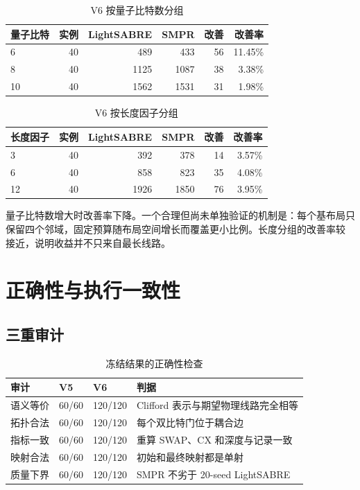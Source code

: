 \documentclass[11pt,a4paper]{article}
\begin{document}
\begin{table}[H]
\centering
\caption{V6 按量子比特数分组}
\begin{tabular}{lrrrrr}
\toprule
量子比特 & 实例 & LightSABRE & SMPR & 改善 & 改善率 \\
\midrule
6 & 40 & 489 & 433 & 56 & 11.45\% \\
8 & 40 & 1125 & 1087 & 38 & 3.38\% \\
10 & 40 & 1562 & 1531 & 31 & 1.98\% \\
\bottomrule
\end{tabular}
\end{table}

\begin{table}[H]
\centering
\caption{V6 按长度因子分组}
\begin{tabular}{lrrrrr}
\toprule
长度因子 & 实例 & LightSABRE & SMPR & 改善 & 改善率 \\
\midrule
3 & 40 & 392 & 378 & 14 & 3.57\% \\
6 & 40 & 858 & 823 & 35 & 4.08\% \\
12 & 40 & 1926 & 1850 & 76 & 3.95\% \\
\bottomrule
\end{tabular}
\end{table}

量子比特数增大时改善率下降。一个合理但尚未单独验证的机制是：每个基布局只
保留四个邻域，固定预算随布局空间增长而覆盖更小比例。长度分组的改善率较
接近，说明收益并不只来自最长线路。

\section{正确性与执行一致性}

\subsection{三重审计}

\begin{table}[H]
\centering
\caption{冻结结果的正确性检查}
\begin{tabularx}{\textwidth}{Y C{1.5cm} C{1.5cm} Y}
\toprule
审计 & V5 & V6 & 判据 \\
\midrule
语义等价 & 60/60 & 120/120 & Clifford 表示与期望物理线路完全相等 \\
拓扑合法 & 60/60 & 120/120 & 每个双比特门位于耦合边 \\
指标一致 & 60/60 & 120/120 & 重算 SWAP、CX 和深度与记录一致 \\
映射合法 & 60/60 & 120/120 & 初始和最终映射都是单射 \\
质量下界 & 60/60 & 120/120 & SMPR 不劣于 20-seed LightSABRE \\
\bottomrule
\end{tabularx}
\end{table}
\end{document}
